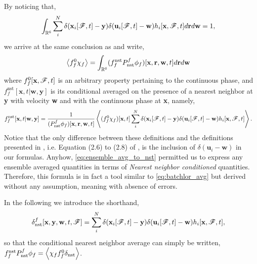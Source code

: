 By noticing that, 
\begin{equation}
    \int_{\mathbb{R}^6}
    \sum_i^N 
    \delta(\textbf{x}_i[\mathscr{F},t]-\textbf{y})
    \delta(\textbf{u}_i[\mathscr{F},t]-\textbf{w})
    h_i[\textbf{x},\mathscr{F},t]
    d\textbf{r}
    d\textbf{w} 
    =1,
\end{equation}
we arrive at the same conclusion as \citet{zhang2021ensemble} and write, 
\begin{equation}
    \avg{f_f^0\chi_f}
    = 
    \int_{\mathbb{R}^6}
    (f_f^\text{nst}P_\text{nst}^f\phi_f)[\textbf{x},\textbf{r},\textbf{w},t]
    d\textbf{r}
    d\textbf{w}
    \label{eq:ensemble_avg_to_nst}
\end{equation} 
where $f_f^0[\textbf{x},\mathscr{F},t]$ is an arbitrary property pertaining to the continuous phase, and $f_f^\text{nst}[\textbf{x},t|\textbf{w},\textbf{y}]$ is its conditional averaged on the presence of a nearest neighbor at \textbf{y} with velocity \textbf{w} and with the continuous phase at \textbf{x}, namely, 
\begin{equation}
    f_f^\text{nst}[\textbf{x},t|\textbf{w},\textbf{y}]
    =\frac{1}{(P_\text{nst}^f\phi_f) [\textbf{x},\textbf{r},\textbf{w},t]}
    \avg{
        (f_f^0
        \chi_f)[\textbf{x},t]
        \sum_i^N 
        \delta(\textbf{x}_i[\FF,t]-\textbf{y})
        \delta(\textbf{u}_i[\FF,t]-\textbf{w})
        h_i[\textbf{x},\FF,t]
    }.
    \label{eq:def_f_nst}
\end{equation}
Notice that the only difference between these definitions and the definitions presented in \citet{zhang2021ensemble}, i.e. Equation (2.6) to (2.8) of \citet{zhang2021ensemble}, is the inclusion of $\delta(\textbf{u}_i - \textbf{w})$ in our formulas. 
Anyhow, \ref{eq:ensemble_avg_to_nst} permitted us to express any ensemble averaged quantities in terms of \textit{Nearest neighbor conditioned} quantities. 
Therefore, this formula is in fact a tool similar to \ref{eq:batchlor_avg} but derived without any assumption, meaning with absence of errors. 

In the following we introduce the shorthand, 
\begin{equation*}
    \delta_\text{nst}^f [\textbf{x},\textbf{y},\textbf{w},t,\mathscr{F}]
    =
    \sum_i^N 
    \delta(\textbf{x}_i[\mathscr{F},t]-\textbf{y})
    \delta(\textbf{u}_i[\mathscr{F},t]-\textbf{w})
    h_i[\textbf{x},\mathscr{F},t],
\end{equation*}
so that the conditional nearest neighbor average can simply be written, $f_f^\text{nst} P_\text{nst}^f \phi_f = \left<\chi_f f_f^0 \delta_\text{nst}\right>$.

